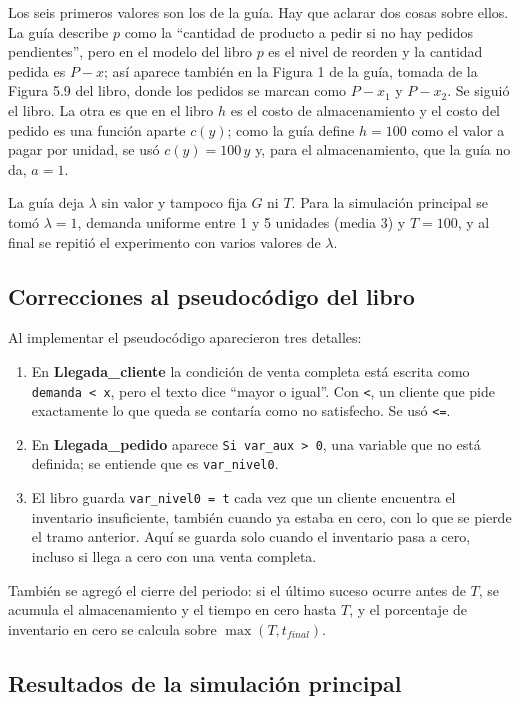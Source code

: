 \documentclass[11pt,letterpaper]{article}
\begin{document}
Los seis primeros valores son los de la guía. Hay que aclarar dos cosas sobre ellos. La guía describe $p$ como
la ``cantidad de producto a pedir si no hay pedidos pendientes'', pero en el modelo del libro $p$ es el
nivel de reorden y la cantidad pedida es $P - x$; así aparece también en la Figura 1 de la guía, tomada
de la Figura 5.9 del libro, donde los pedidos se marcan como $P - x_1$ y $P - x_2$. Se siguió el libro. La otra
es que en el libro $h$ es el costo de almacenamiento y el costo del pedido es una función aparte $c(y)$; como la
guía define $h = 100$ como el valor a pagar por unidad, se usó $c(y) = 100\,y$ y, para el almacenamiento, que la
guía no da, $a = 1$.

La guía deja $\lambda$ sin valor y tampoco fija $G$ ni $T$. Para la simulación principal se tomó $\lambda = 1$,
demanda uniforme entre 1 y 5 unidades (media 3) y $T = 100$, y al final se repitió el experimento con varios
valores de $\lambda$.

\subsection{Correcciones al pseudocódigo del libro}

Al implementar el pseudocódigo aparecieron tres detalles:

\begin{enumerate}[itemsep=2pt]
\item En \textbf{Llegada\_cliente} la condición de venta completa está escrita como \texttt{demanda < x}, pero
el texto dice ``mayor o igual''. Con \texttt{<}, un cliente que pide exactamente lo que queda se contaría como no
satisfecho. Se usó \texttt{<=}.
\item En \textbf{Llegada\_pedido} aparece \texttt{Si var\_aux > 0}, una variable que no está definida; se
entiende que es \texttt{var\_nivel0}.
\item El libro guarda \texttt{var\_nivel0 = t} cada vez que un cliente encuentra el inventario insuficiente,
también cuando ya estaba en cero, con lo que se pierde el tramo anterior. Aquí se guarda solo cuando el inventario
pasa a cero, incluso si llega a cero con una venta completa.
\end{enumerate}

También se agregó el cierre del periodo: si el último suceso ocurre antes de $T$, se acumula el almacenamiento y
el tiempo en cero hasta $T$, y el porcentaje de inventario en cero se calcula sobre $\max(T, t_{final})$.

\subsection{Resultados de la simulación principal}
\end{document}
